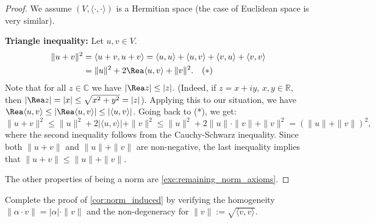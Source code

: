 \begin{proof}
    We assume $(V, \langle \cdot, \cdot \rangle)$ is a Hermitian space (the case of Euclidean space is very similar).
    
    \textbf{Triangle inequality:} Let $u, v \in V$.
    \begin{align*}
        \|u + v\|^2 &= \langle u + v, u + v \rangle = \langle u, u \rangle + \langle u, v \rangle + \langle v, u \rangle + \langle v, v \rangle \\
        &= \|u\|^2 + 2 \Rea \langle u, v \rangle + \|v\|^2. \quad (*)
    \end{align*}
    Note that for all $z \in \mathbb{C}$ we have $|\Rea z| \leq |z|$. (Indeed, if $z = x + iy$, $x, y \in \mathbb{R}$, then $|\Rea z| = |x| \leq \sqrt{x^2 + y^2} = |z|$).
    Applying this to our situation, we have $\Rea \langle u, v \rangle \leq |\Rea \langle u, v \rangle| \leq |\langle u, v \rangle|$.
    Going back to (*), we get:
    \[
        \|u + v\|^2 \leq \|u\|^2 + 2 |\langle u, v \rangle| + \|v\|^2 \leq \|u\|^2 + 2 \|u\| \cdot \|v\| + \|v\|^2 = (\|u\| + \|v\|)^2,
    \]
    where the second inequality follows from the Cauchy-Schwarz inequality.
    Since both $\|u + v\|$ and $\|u\| + \|v\|$ are non-negative, the last inequality implies that $\|u + v\| \leq \|u\| + \|v\|$.

    The other properties of being a norm are \cref{exc:remaining_norm_axioms}.
\end{proof}

\begin{exercise}
    \label{exc:remaining_norm_axioms}
    Complete the proof of \cref{cor:norm_induced} by verifying the homogeneity $\|\alpha \cdot v\| = |\alpha| \cdot \|v\|$ and the non-degeneracy  for $\|v\| := \sqrt{\langle v, v \rangle}$.
\end{exercise}


